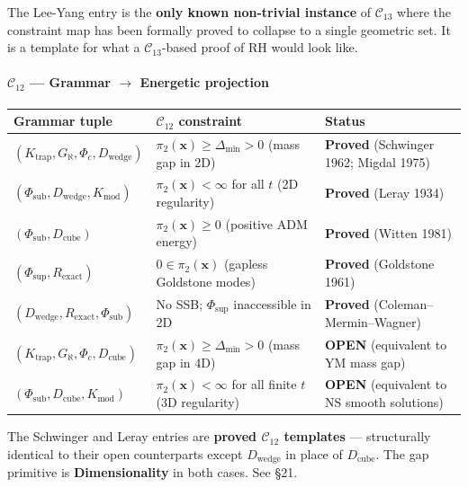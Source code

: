 \documentclass[12pt,a4paper]{article}
\newcommand{\pilcrow}{\S}
\begin{document}
The Lee-Yang entry is the \textbf{only known non-trivial instance} of $\mathcal{C}_{13}$ where the constraint map has been formally proved to collapse to a single geometric set. It is a template for what a $\mathcal{C}_{13}$-based proof of RH would look like.

\paragraph{$\mathcal{C}_{12}$ --- Grammar $\rightarrow$ Energetic projection}

\begin{table}[htbp]
\centering
\small
{}
\begin{tabularx}{\textwidth}{>{\centering\arraybackslash}X >{\centering\arraybackslash}X >{\centering\arraybackslash}X}
\toprule
\rowcolor{gray!25}\textbf{Grammar tuple} & \textbf{$\mathcal{C}_{12}$ constraint} & \textbf{Status} \\
\midrule
\rowcolors{1}{white}{gray!10}
$(K_\text{trap}, G_{\aleph}, \Phi_c, D_\text{wedge})$ & $\pi_2(\mathbf{x}) \geq \Delta_\text{min} > 0$ (mass gap in 2D) &  \textbf{Proved} (Schwinger 1962; Migdal 1975) \\
$(\Phi_\text{sub}, D_\text{wedge}, K_\text{mod})$ & $\pi_2(\mathbf{x}) < \infty$ for all $t$ (2D regularity) &  \textbf{Proved} (Leray 1934) \\
$(\Phi_\text{sub}, D_\text{cube})$ & $\pi_2(\mathbf{x}) \geq 0$ (positive ADM energy) &  \textbf{Proved} (Witten 1981) \\
$(\Phi_\text{sup}, R_\text{exact})$ & $0 \in \pi_2(\mathbf{x})$ (gapless Goldstone modes) &  \textbf{Proved} (Goldstone 1961) \\
$(D_\text{wedge}, R_\text{exact}, \Phi_\text{sub})$ & No SSB; $\Phi_\text{sup}$ inaccessible in 2D &  \textbf{Proved} (Coleman--Mermin--Wagner) \\
$(K_\text{trap}, G_{\aleph}, \Phi_c, D_\text{cube})$ & $\pi_2(\mathbf{x}) \geq \Delta_\text{min} > 0$ (mass gap in 4D) & \textbf{OPEN} (equivalent to YM mass gap) \\
$(\Phi_\text{sub}, D_\text{cube}, K_\text{mod})$ & $\pi_2(\mathbf{x}) < \infty$ for all finite $t$ (3D regularity) & \textbf{OPEN} (equivalent to NS smooth solutions) \\
\bottomrule
\end{tabularx}
\end{table}

The Schwinger and Leray entries are \textbf{proved $\mathcal{C}_{12}$ templates} --- structurally identical to their open counterparts except $D_\text{wedge}$ in place of $D_\text{cube}$. The gap primitive is \textbf{Dimensionality} in both cases. See \pilcrow{}21.
\end{document}
